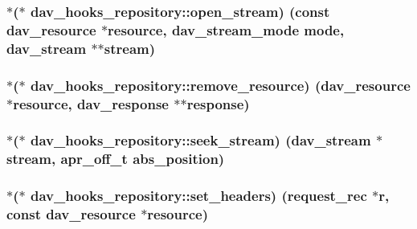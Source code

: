 \subsubsection[{\texorpdfstring{open\+\_\+stream}{open_stream}}]{$\ast$($\ast$ dav\+\_\+hooks\+\_\+repository\+::open\+\_\+stream) (const {\bf dav\+\_\+resource} $\ast${\bf resource}, {\bf dav\+\_\+stream\+\_\+mode} {\bf mode}, {\bf dav\+\_\+stream} $\ast$$\ast$stream)}\hypertarget{structdav__hooks__repository_aef60be7356bf83753891da839d96c1ae}{}\label{structdav__hooks__repository_aef60be7356bf83753891da839d96c1ae}
\subsubsection[{\texorpdfstring{remove\+\_\+resource}{remove_resource}}]{$\ast$($\ast$ dav\+\_\+hooks\+\_\+repository\+::remove\+\_\+resource) ({\bf dav\+\_\+resource} $\ast${\bf resource}, {\bf dav\+\_\+response} $\ast$$\ast${\bf response})}\hypertarget{structdav__hooks__repository_a47d859552797ff6241c66b795bddf674}{}\label{structdav__hooks__repository_a47d859552797ff6241c66b795bddf674}
\subsubsection[{\texorpdfstring{seek\+\_\+stream}{seek_stream}}]{$\ast$($\ast$ dav\+\_\+hooks\+\_\+repository\+::seek\+\_\+stream) ({\bf dav\+\_\+stream} $\ast$stream, {\bf apr\+\_\+off\+\_\+t} abs\+\_\+position)}\hypertarget{structdav__hooks__repository_a90d675ee018d153888e517052a1e25fb}{}\label{structdav__hooks__repository_a90d675ee018d153888e517052a1e25fb}
\subsubsection[{\texorpdfstring{set\+\_\+headers}{set_headers}}]{$\ast$($\ast$ dav\+\_\+hooks\+\_\+repository\+::set\+\_\+headers) ({\bf request\+\_\+rec} $\ast${\bf r}, const {\bf dav\+\_\+resource} $\ast${\bf resource})}\hypertarget{structdav__hooks__repository_a879b66e14bad410850644fdf37fc31cb}{}\label{structdav__hooks__repository_a879b66e14bad410850644fdf37fc31cb}
